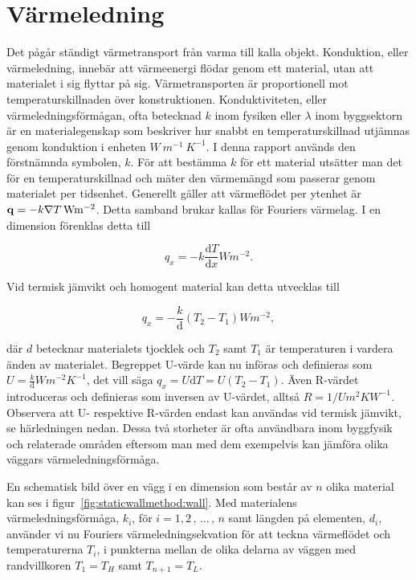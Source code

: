 \section{Värmeledning}
\label{sec:heatconduction}

Det pågår ständigt värmetransport från varma till kalla objekt. Konduktion, eller värmeledning, innebär att värmeenergi flödar genom ett material, utan att materialet i sig flyttar på sig. Värmetransporten är proportionell mot temperaturskillnaden över konstruktionen. Konduktiviteten, eller värmeledningsförmågan, ofta betecknad $k$ inom fysiken eller $\lambda$ inom byggsektorn är en materialegenskap som beskriver hur snabbt en temperaturskillnad utjämnas genom konduktion i enheten $\unit{W~m^{-1}~K^{-1}}$. I denna rapport används den förstnämnda symbolen, $k$. För att bestämma $k$ för ett material utsätter man det för en temperaturskillnad och mäter den värmemängd som passerar genom materialet per tidsenhet. Generellt gäller att värmeflödet per ytenhet är $\mathbf{q} = - \unit[k \nabla T]{Wm^{-2}}$. Detta samband brukar kallas för Fouriers värmelag. I en dimension förenklas detta till

\begin{equation}\label{eq:conduction:fourier}\boxed{ \; \; \;
q_x = -k \frac{\mathrm{d}T}{\mathrm{d}x} \unit{Wm^{-2}}.
\; \; \; }
\end{equation}

Vid termisk jämvikt och homogent material kan detta utvecklas till

\begin{equation}
q_x = -\frac{k}{\mathrm{d}}\left( T_2-T_1\right) \unit{Wm^{-2}},
\end{equation}

där $d$ betecknar materialets tjocklek och $T_2$ samt $T_1$ är temperaturen i vardera änden av materialet. Begreppet U-värde kan nu införas och definieras som $U = \frac{k}{\mathrm{d}} \unit{Wm^{-2}K^{-1}}$, det vill säga $q_x = U\mathrm{d}T = U\left( T_2-T_1 \right)$. Även R-värdet introduceras och definieras som inversen av U-värdet, alltså $R=1/U \unit{m^2KW^{-1}}$. Observera att U- respektive R-värden endast kan användas vid termisk jämvikt, se härledningen nedan. Dessa två storheter är ofta användbara inom byggfysik och relaterade områden eftersom man med dem exempelvis kan jämföra olika väggars värmeledningsförmåga.

En schematisk bild över en vägg i en dimension som består av $n$ olika material kan ses i figur~\ref{fig:staticwallmethod:wall}. Med materialens värmeledningsförmåga, $k_i$, för $i=1,2\,,\,...\,,\,n$ samt längden på elementen, $d_i$, använder vi nu Fouriers värmeledningsekvation för att teckna värmeflödet och temperaturerna $T_i$, i punkterna mellan de olika delarna av väggen med randvillkoren $T_1 = T_H$ samt $T_{n+1} = T_L$.

